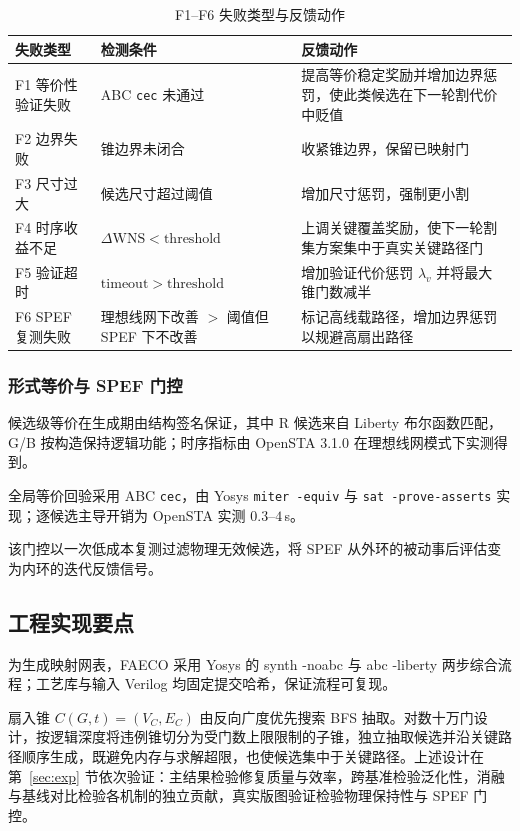 \documentclass[journal]{IEEEtran}
\begin{document}
\begin{table}[!t]
\centering
\caption{F1--F6 失败类型与反馈动作}
\label{tab:failures}
\scriptsize
\setlength{\tabcolsep}{2pt}
\begin{tabular}{p{2.0cm}p{3.2cm}p{2.9cm}}
\toprule
\textbf{失败类型} & \textbf{检测条件} & \textbf{反馈动作} \\
\midrule
F1 等价性验证失败 & ABC \texttt{cec} 未通过 & 提高等价稳定奖励并增加边界惩罚，使此类候选在下一轮割代价中贬值 \\
F2 边界失败 & 锥边界未闭合 & 收紧锥边界，保留已映射门 \\
F3 尺寸过大 & 候选尺寸超过阈值 & 增加尺寸惩罚，强制更小割 \\
F4 时序收益不足 & $\Delta\mathrm{WNS} < \mathrm{threshold}$ & 上调关键覆盖奖励，使下一轮割集方案集中于真实关键路径门 \\
F5 验证超时 & $\mathrm{timeout} > \mathrm{threshold}$ & 增加验证代价惩罚 $\lambda_v$ 并将最大锥门数减半 \\
F6 SPEF 复测失败 & 理想线网下改善 $>$ 阈值但 SPEF 下不改善 & 标记高线载路径，增加边界惩罚以规避高扇出路径 \\
\bottomrule
\end{tabular}
\end{table}

\subsubsection{形式等价与 SPEF 门控}
候选级等价在生成期由结构签名保证，其中 R 候选来自 Liberty 布尔函数匹配，G/B 按构造保持逻辑功能；时序指标由 OpenSTA 3.1.0 在理想线网模式下实测得到。

全局等价回验采用 ABC \texttt{cec}，由 Yosys \texttt{miter -equiv} 与 \texttt{sat -prove-asserts} 实现；逐候选主导开销为 OpenSTA 实测 $0.3$--$4\,$s。

该门控以一次低成本复测过滤物理无效候选，将 SPEF 从外环的被动事后评估变为内环的迭代反馈信号。

\subsection{工程实现要点}\label{sec:impl}

为生成映射网表，FAECO 采用 Yosys 的 synth -noabc 与 abc -liberty 两步综合流程；工艺库与输入 Verilog 均固定提交哈希，保证流程可复现。

扇入锥 $C(G, t) = (V_C, E_C)$ 由反向广度优先搜索 BFS 抽取。对数十万门设计，按逻辑深度将违例锥切分为受门数上限限制的子锥，独立抽取候选并沿关键路径顺序生成，既避免内存与求解超限，也使候选集中于关键路径。上述设计在第~\ref{sec:exp} 节依次验证：主结果检验修复质量与效率，跨基准检验泛化性，消融与基线对比检验各机制的独立贡献，真实版图验证检验物理保持性与 SPEF 门控。
\end{document}
